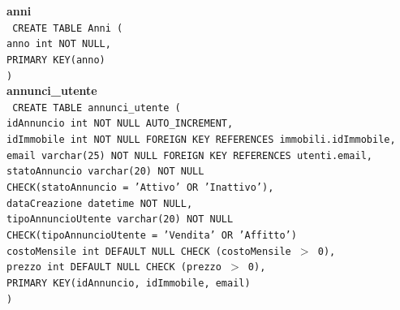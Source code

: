 \documentclass[a4paper,12pt]{report}
\begin{document}
                \noindent
                {\large \textbf{anni}} \\
                \texttt{
                    CREATE TABLE Anni ( \\
                    \null\quad\quad anno    int     NOT NULL, \\
                    \null\quad\quad PRIMARY KEY(anno) \\
                    )
                } \\

                \noindent
                {\large \textbf{annunci\_utente}} \\
                \texttt{
                    CREATE TABLE annunci\_utente ( \\
                    \null\quad\quad idAnnuncio          int             NOT NULL AUTO\_INCREMENT, \\ 
                    \null\quad\quad idImmobile int NOT NULL FOREIGN KEY REFERENCES immobili.idImmobile, \\
                    \null\quad\quad email varchar(25) NOT NULL FOREIGN KEY REFERENCES utenti.email, \\
                    \null\quad\quad statoAnnuncio       varchar(20)         NOT NULL \\
                            \null\qquad\qquad CHECK(statoAnnuncio = 'Attivo' OR 'Inattivo'), \\
                    \null\quad\quad dataCreazione       datetime        NOT NULL, \\
                    \null\quad\quad tipoAnnuncioUtente  varchar(20)  NOT NULL \\
                            \null\qquad\qquad CHECK(tipoAnnuncioUtente = 'Vendita' OR 'Affitto') \\
                    \null\quad\quad costoMensile        int             DEFAULT NULL CHECK (costoMensile $>$ 0), \\
                    \null\quad\quad prezzo              int             DEFAULT NULL CHECK (prezzo $>$ 0),\\
                    \null\quad\quad PRIMARY KEY(idAnnuncio, idImmobile, email) \\
                    )
                    } \\
\end{document}
